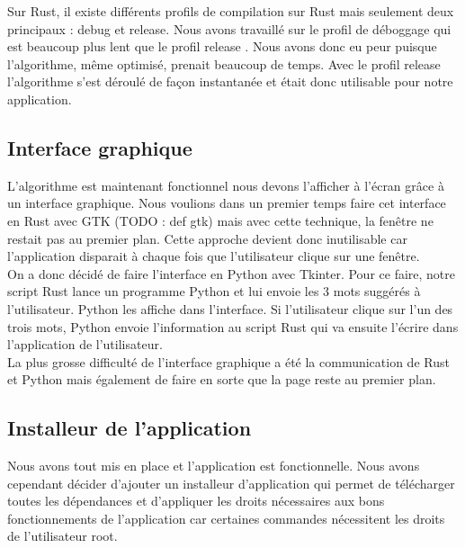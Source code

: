 \documentclass[a4paper, 11pt]{report}
\begin{document}
Sur Rust, il existe  différents profils de compilation sur Rust mais seulement deux principaux : \og debug \fg et \og release\fg. Nous avons travaillé sur le profil de déboggage qui est beaucoup plus lent que le profil \og release \fg. Nous avons donc eu peur puisque l'algorithme, même optimisé, prenait beaucoup de temps. Avec le profil \og release \fg l'algorithme s'est déroulé de façon instantanée et était donc utilisable pour notre application. 

\subsection{Interface graphique}

L'algorithme est maintenant fonctionnel nous devons l'afficher à l'écran grâce à un interface graphique. Nous voulions dans un premier temps faire cet interface en Rust avec GTK (TODO : def gtk) mais avec cette technique, la fenêtre ne restait pas au premier plan. Cette approche devient donc inutilisable car l'application disparait à chaque fois que l'utilisateur clique sur une fenêtre.\\

On a donc décidé de faire l'interface en Python avec Tkinter. Pour ce faire, notre script Rust lance un programme Python et lui envoie les 3 mots suggérés à l'utilisateur. Python les affiche dans l'interface. Si l'utilisateur clique sur l'un des trois mots, Python envoie l'information au script Rust qui va ensuite l'écrire dans l'application de l'utilisateur.\\

La plus grosse difficulté de l'interface graphique a été la communication de Rust et Python mais également de faire en sorte que la page reste au premier plan. 

\subsection{Installeur de l'application}

Nous avons tout mis en place et l'application est fonctionnelle. Nous avons cependant décider d'ajouter un installeur d'application qui permet de télécharger toutes les dépendances et d'appliquer les droits nécessaires aux bons fonctionnements de l'application car certaines commandes nécessitent les droits de l'utilisateur root. \\
\end{document}
